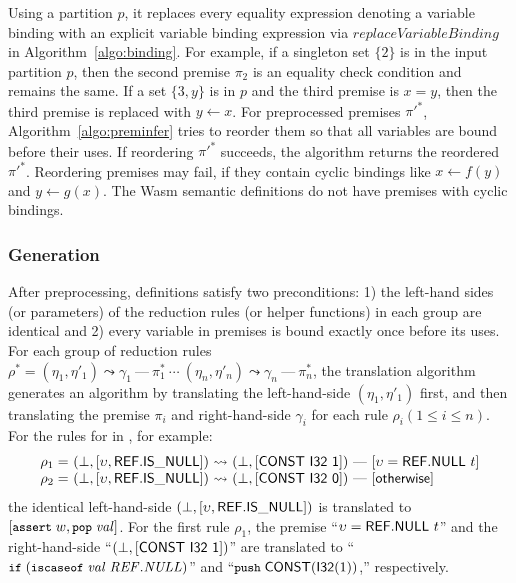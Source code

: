 Using a partition $p$, it replaces every equality expression denoting a variable binding 
with an explicit variable binding expression via $\mathit{replaceVariableBinding}$ in Algorithm~\ref{algo:binding}.
For example, if a singleton set $\{2\}$ is in the input partition $p$,
then the second premise $\pi_2$ is an equality check condition and remains the same.
If a set $\{3, y\}$ is in $p$ and the third premise is $x = y$,
then the third premise is replaced with $y \leftarrow x$.
For preprocessed premises $\pi'^*$, Algorithm~\ref{algo:preminfer} tries to reorder them 
so that all variables are bound before their uses.
If reordering $\pi'^*$ succeeds, the algorithm returns the reordered $\pi'^*$.
Reordering premises may fail, if they contain cyclic bindings like $x \leftarrow f(y)$ and $y \leftarrow g(x)$.
The Wasm semantic definitions do not have premises with cyclic bindings.

\subsubsection{\al Generation}
After preprocessing, \dl definitions satisfy two preconditions:
1) the left-hand sides (or parameters) of the reduction rules (or helper functions) in each group
are identical and 2) every variable in premises is bound exactly once before its uses.
For each group of reduction rules $\rho^* =
(\eta_1, \eta' _1)  \leadsto \gamma_1\ \mbox{---}\ \pi_1^*\
\cdots\
(\eta_n, \eta' _n) \leadsto \gamma_n\ \mbox{---}\ \pi_n^*$,
the translation algorithm \dltoil generates an \al algorithm
by translating the left-hand-side $(\eta_1, \eta' _1)$ first,
and then translating the premise $\pi_i$ and right-hand-side $\gamma_i$
for each rule $\rho_i (1\le i\le n)$.
For the rules for \inblue{\ensuremath{\mathsf{ref.is\_null}}} in \dl, for example:
\[
\begin{array}{l@{~}l@{~}c@{~}l}
\rho_1 = &(\bot, [\upsilon, \ssf{REF.IS\_NULL}]) &\leadsto& (\bot, [\ssf{CONST\ I32\ 1}])\
\mbox{---}\ [\upsilon = \ssf{REF.NULL}\ t]\\
\rho_2 = &(\bot, [\upsilon, \ssf{REF.IS\_NULL}])&\leadsto&(\bot, [\ssf{CONST\ I32\ 0}])\
\mbox{---}\ [\ssf{\small otherwise}]
\end{array}
\]
the identical left-hand-side $(\bot, [\upsilon, \mathsf{REF.IS\_NULL}])$
is translated to $[\texttt{\small assert} \; w, \texttt{\small pop} \; \mathit{val}]$.
For the first rule $\rho_1$, the premise ``$\upsilon = \ssf{REF.NULL}\ t$'' and
the right-hand-side ``$(\bot, [\mathsf{CONST\ I32\ 1}])$'' are translated to
``$\texttt{\small if} \; (\texttt{\small iscaseof} \; \mathit{val} \; \mathit{REF.NULL})$'' and
``$\texttt{\small push} \; \mathsf{CONST}(\mathsf{I32}(1))$,'' respectively.


